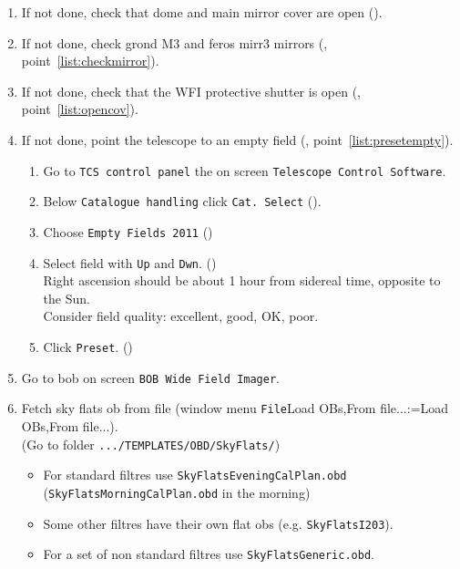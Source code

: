 \documentclass[11pt,fleqn,a4paper]{book}
\makeatletter
\def\menu#1#2{\texttt{#1}\ifx{}#2\else\@for\@x:=#2\do{$\rightarrow$\texttt{\@x}}\fi}
\def\wmenu#1#2{window menu \menu{#1}{#2}}
\def\fetchob{\wmenu{File}{Load OBs,From file...}}
\makeatother
\begin{document}
\begin{enumerate}
  \item If not done, check that \gls{dome} and \gls{main mirror} cover are open (). 
  \item If not done, check \gls{grond} \gls{M3} and \gls{feros} \gls{mirr3} mirrors (, point~\ref{list:checkmirror}).
  \item If not done, check that the WFI \gls{protective shutter} is open (, point~\ref{list:opencov}).
  \item If not done, point the telescope to an empty field (, point~\ref{list:presetempty}).
      \begin{enumerate}
         \item Go to \texttt{TCS control panel} the on screen \texttt{Telescope Control Software}.
         \item Below \texttt{Catalogue handling} click \texttt{Cat. Select} ().
         \item Choose \texttt{Empty Fields 2011} ()
         \item Select field with \texttt{Up} and \texttt{Dwn}. ()\\
               Right ascension should be about 1 hour from sidereal time, opposite to the Sun.\\
               Consider field quality: excellent, good, OK, poor.
         \item Click \texttt{Preset}. ()
      \end{enumerate}
  \item Go to \gls{bob} on screen \texttt{BOB Wide Field Imager}.
  \item Fetch \gls{sky flats} \gls{ob} from file (\fetchob).\\
        (Go to folder \texttt{.../TEMPLATES/OBD/SkyFlats/})
    \begin{itemize}
       \item For standard filtres use \texttt{SkyFlatsEveningCalPlan.obd}\\
           (\texttt{SkyFlatsMorningCalPlan.obd} in the morning)
       \item Some other filtres have their own flat \glspl{ob} (e.g. \texttt{SkyFlatsI203}).
       \item For a set of non standard filtres use \texttt{SkyFlatsGeneric.obd}.
    \end{itemize}

\end{enumerate}
\end{document}
